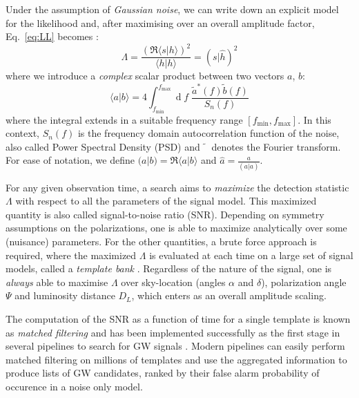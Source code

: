 \documentclass[twocolumn,showpacs,preprintnumbers,nofootinbib,prd,
superscriptaddress,10pt]{revtex4-2}
\renewcommand{\d}[1]{\ensuremath{\operatorname{d}\!{#1}}}
\newcommand{\scalar}[2]{\langle #1|#2 \rangle}
\newcommand{\rescalar}[2]{( #1 |#2 )}
\begin{document}
Under the assumption of {\it Gaussian noise}, we can write down an explicit model for the likelihood and, after maximising over an overall amplitude factor, Eq.~\eqref{eq:LL} becomes \cite{Creighton_book, Maggiore:2007ulw, Harry:2016ijz}:
\begin{equation}\label{eq:LL_gauss}
	\Lambda = \frac{\left(\Re\scalar{s}{h}\right)^2}{\scalar{h}{h}} = \rescalar{s}{\hat{h}}^2
\end{equation}
where we introduce a {\it complex} scalar product between two vectors $a$, $b$:
\begin{equation} \label{eq:scalar_product}
	\scalar{a}{b} = 4 \int_{f_\text{min}}^{f_\text{max}} \!\!\!\! \d{f} \; \frac{\tilde{a}^*(f) \tilde{b}(f)}{S_n(f)}
\end{equation}
where the integral extends in a suitable frequency range $[f_\text{min}, f_\text{max}]$.
In this context, $S_n(f)$ is the frequency domain autocorrelation function of the noise, also called Power Spectral Density (PSD) and $\tilde{\phantom{a}}$ denotes the Fourier transform.
For ease of notation, we define ${\rescalar{a}{b} = \Re\scalar{a}{b}}$ and ${\hat{a} = \frac{a}{\rescalar{a}{a}}}$.

For any given observation time, a search aims to {\it maximize} the detection statistic $\Lambda$ with respect to all the parameters of the signal model. This maximized quantity is also called signal-to-noise ratio (SNR).
Depending on symmetry assumptions on the polarizations, one is able to maximize analytically over some (nuisance) parameters.
For the other quantities, a brute force approach is required, where the maximized $\Lambda$ is evaluated at each time on a large set of signal models, called a {\it template bank} \cite{PhysRevD.77.104017, Mukherjee:2018yra}.
Regardless of the nature of the signal, one is {\it always} able to maximise $\Lambda$ over sky-location (angles $\alpha$ and $\delta$), polarization angle $\Psi$ and luminosity distance $D_L$, which enters as an overall amplitude scaling.

The computation of the SNR as a function of time for a single template is known as {\it matched filtering} and has been implemented successfully as the first stage in several pipelines to search for GW signals \cite{Privitera:2013xza, Usman:2015kfa, Capano:2016dsf, PhysRevD.95.042001, Nitz:2017svb, gstlal_paper2, Aubin:2020goo, Chu:2020pjv}. Modern pipelines can easily perform matched filtering on millions of templates and use the aggregated information to produce lists of GW candidates, ranked by their false alarm probability of occurence in a noise only model.
\end{document}

